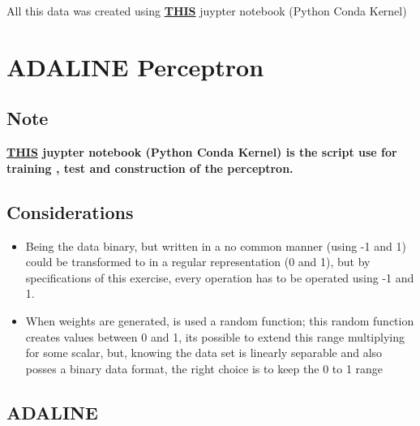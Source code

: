 \documentclass[10pt,a4paper]{report}
\begin{document}
	All this data was created using \href{https://nbviewer.jupyter.org/github/jahirmedinacs/usp-2018-2_IRNA/blob/master/Aula\%201/exe1/Data.ipynb}{\textbf{THIS}} juypter notebook (Python Conda Kernel)
	
	\section{ADALINE Perceptron}
	
	\subsection{Note}
	\textbf{{\large \href{https://nbviewer.jupyter.org/github/jahirmedinacs/usp-2018-2_IRNA/blob/master/Aula\%201/exe1/exc1.ipynb}{\textbf{THIS}} juypter notebook (Python Conda Kernel) is the script use for training , test and construction of the perceptron.}}
	
	\subsection{Considerations}
	
	\begin{itemize}
		\item Being the data binary, but written in a no common manner (using -1 and 1) could be transformed to in a regular representation (0 and 1), but by specifications of this exercise, every operation has to be operated using -1 and 1.
		\item When weights are generated, is used a random function; this random function creates values between 0 and 1, its possible to extend this range multiplying for some scalar, but, knowing the data set is linearly separable and also posses a binary data format, the right choice is to keep the 0 to 1 range
	\end{itemize}

	\subsection{ADALINE}
	
\end{document}
